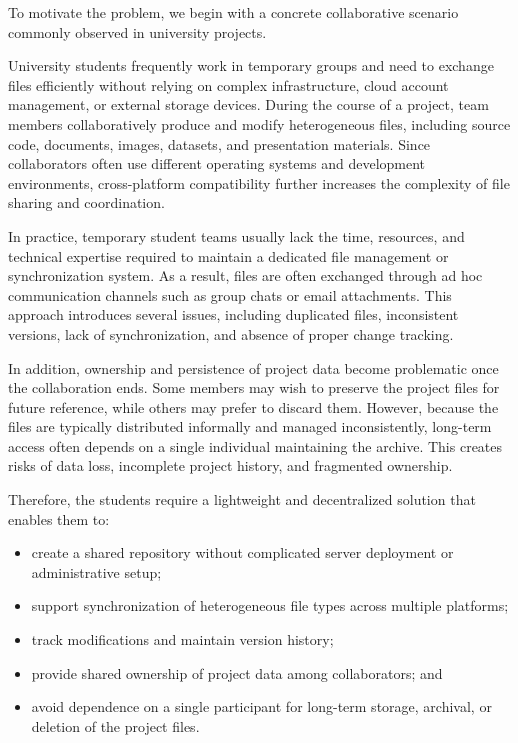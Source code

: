 \documentclass[11pt,oneside]{article}
\begin{document}
To motivate the problem, we begin with a concrete collaborative scenario commonly observed in university projects.\par
University students frequently work in temporary groups and need to exchange files efficiently without relying on complex infrastructure, cloud account management, or external storage devices. During the course of a project, team members collaboratively produce and modify heterogeneous files, including source code, documents, images, datasets, and presentation materials. Since collaborators often use different operating systems and development environments, cross-platform compatibility further increases the complexity of file sharing and coordination.\par
In practice, temporary student teams usually lack the time, resources, and technical expertise required to maintain a dedicated file management or synchronization system. As a result, files are often exchanged through ad hoc communication channels such as group chats or email attachments. This approach introduces several issues, including duplicated files, inconsistent versions, lack of synchronization, and absence of proper change tracking.\par
In addition, ownership and persistence of project data become problematic once the collaboration ends. Some members may wish to preserve the project files for future reference, while others may prefer to discard them. However, because the files are typically distributed informally and managed inconsistently, long-term access often depends on a single individual maintaining the archive. This creates risks of data loss, incomplete project history, and fragmented ownership.\par
Therefore, the students require a lightweight and decentralized solution that enables them to:
\begin{itemize}
    \item create a shared repository without complicated server deployment or administrative setup;
    \item support synchronization of heterogeneous file types across multiple platforms;
    \item track modifications and maintain version history;
    \item provide shared ownership of project data among collaborators; and
    \item avoid dependence on a single participant for long-term storage, archival, or deletion of the project files.
\end{itemize}
\end{document}
